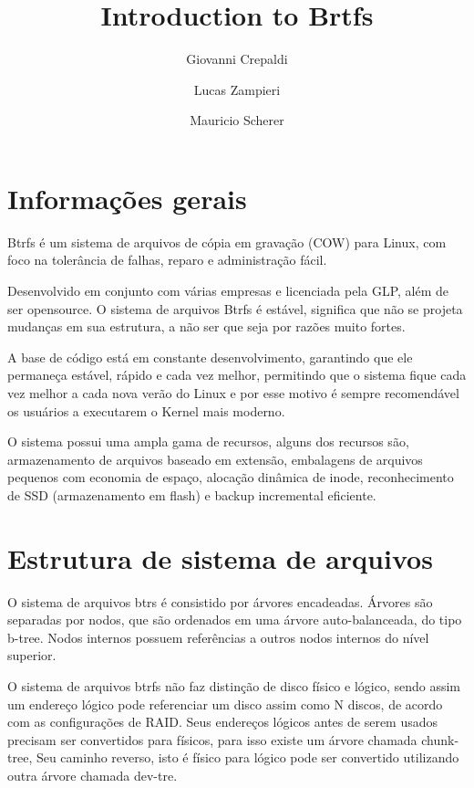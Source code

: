\documentclass[12pt]{article}
\title{Introduction to Brtfs}
\author[1]{Giovanni Crepaldi}
\author[2]{Lucas  Zampieri}
\author[3]{Mauricio Scherer}
\affil[1]{giovannecrepaldi@gmail.com}
\affil[2]{zampierilucas@unisinos.br}
\affil[3]{mauricio.sscherer@gmail.com}
\begin{document}
 

\maketitle

\section{Informações gerais} 

Btrfs é um sistema de arquivos de cópia em gravação (COW) para Linux, com foco na tolerância de
falhas, reparo e administração fácil.

Desenvolvido em conjunto com várias empresas e licenciada pela GLP, além de ser opensource.
O sistema de arquivos Btrfs é estável, significa que não se projeta mudanças em sua estrutura, a não
ser que seja por razões muito fortes.

A base de código está em constante desenvolvimento, garantindo que ele permaneça estável, rápido
e cada vez melhor, permitindo que o sistema fique cada vez melhor a cada nova verão do Linux e por
esse motivo é sempre recomendável os usuários a executarem o Kernel mais moderno.

O sistema possui uma ampla gama de recursos, alguns dos recursos são, armazenamento de arquivos baseado em extensão, embalagens de arquivos pequenos com economia de espaço, alocação dinâmica de inode, reconhecimento de SSD (armazenamento em flash) e backup incremental eficiente.

\newpage
\section{Estrutura de sistema de arquivos}

O sistema de arquivos btrs é consistido por árvores encadeadas. Árvores são separadas por nodos, que são ordenados em uma árvore auto-balanceada, do tipo b-tree\cite{B-tree}. Nodos internos possuem referências a outros nodos internos do nível superior.

O sistema de arquivos btrfs não faz distinção de disco físico e lógico, sendo assim um endereço lógico pode referenciar um disco assim como N discos, de acordo com as configurações de RAID. Seus endereços lógicos antes de serem usados precisam ser convertidos para físicos, para isso existe um árvore chamada chunk-tree\cite{Btrfs-design}, Seu caminho reverso, isto é físico para lógico pode  ser convertido utilizando outra árvore chamada dev-tre.
\end{document}
